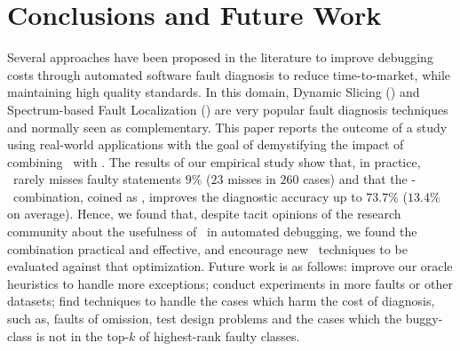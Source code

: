 \documentclass{article}
\begin{document}
\section{Conclusions and Future Work}
\label{sec:conc}
%

Several approaches have been proposed in the literature to improve debugging
costs through automated software fault diagnosis to reduce time-to-market,
while maintaining high quality standards. In this domain, Dynamic Slicing (\ds)
and Spectrum-based Fault Localization (\sfl) are very popular fault diagnosis
techniques and normally seen as complementary. This paper reports the outcome of
a study using real-world applications with the goal of demystifying the impact
of combining \ds~with \sfl. The results of our empirical study show that, in
practice, \ds~rarely misses faulty statements $9\%$ ($23$ misses in $260$ cases) and that
the \ds-\sfl~combination, coined as ,
improves the diagnostic accuracy up to $73.7\%$ ($13.4\%$ on average).
Hence, we found that, despite tacit opinions of the research community about
the usefulness of \ds~in automated debugging, we found the combination practical
and effective, and encourage new \sfl~techniques to be evaluated against that
optimization.
Future work is as follows: improve our oracle heuristics to handle more exceptions;
conduct experiments in more \dfj{} faults or other datasets; find techniques to
handle the cases which harm the cost of diagnosis, such as, faults of omission,
test design problems and the cases which the buggy-class is not in the top-$k$ of
highest-rank faulty classes.

%
{
  \small
  \balance
  
  
}
\end{document}
